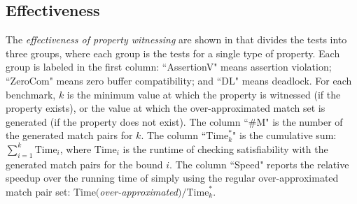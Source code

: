 \subsection{Effectiveness}

The \textit{effectiveness of property witnessing} are shown in  that divides the tests into three groups, where each group is the tests for a single type of property. Each group is labeled in the first column: ``AssertionV" means assertion violation; ``ZeroCom" means zero buffer compatibility; and ``DL" means deadlock. For each benchmark, $k$ is the minimum value at which the property is witnessed (if the property exists), or the value at which the over-approximated match set is generated (if the property does not exist). 
The column ``\#M" is the number of the generated match pairs for $k$. 
The column ``$\mathrm{Time}_k^\ast$" is the cumulative sum: $\sum_{i=1}^k\mathrm{Time}_i$, where $\mathrm{Time}_i$ is the runtime of checking satisfiability with the generated match pairs for the bound $i$.
The column ``Speed" reports the relative speedup over the running time of simply using the regular over-approximated match pair set: $\mathrm{Time}($\textit{over-approximated}$) / \mathrm{Time}_k^\ast$.


